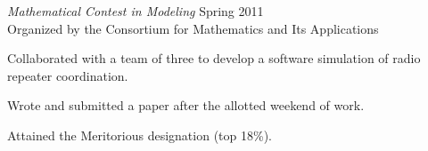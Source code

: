 \documentclass[line,margin,11pt]{res}
\newenvironment{itemize*}%
  {\begin{itemize}%
    \setlength{\parsep}{0pt}
    \setlength{\itemsep}{0pt}%
    \setlength{\parskip}{0pt}}%
  {\end{itemize}}
\begin{document}
\begin{resume}
{\sl Mathematical Contest in Modeling} \hfill Spring 2011\\
Organized by the Consortium for Mathematics and Its Applications
\begin{itemize*}
\item Collaborated with a team of three to develop a software 
  simulation of radio repeater coordination.
\item Wrote and submitted a paper after the allotted weekend of work.
\item Attained the Meritorious designation (top 18\%).
\end{itemize*}

\end{resume}
\end{document}
